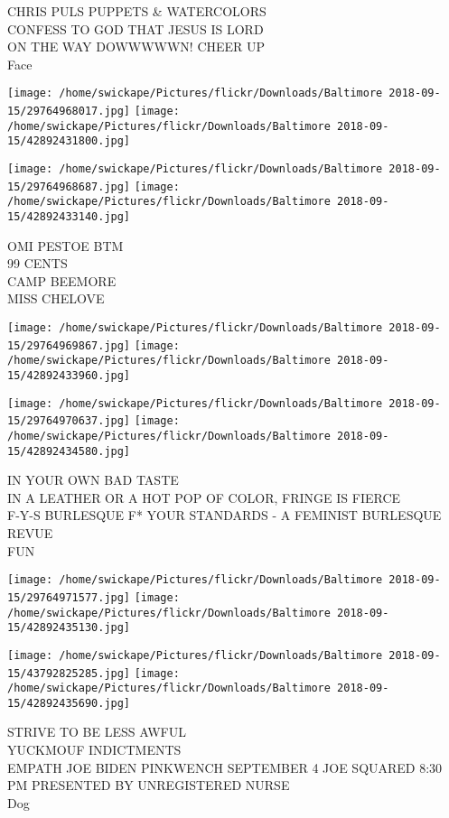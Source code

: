 \documentclass[10pt,letterpaper]{article}
\begin{document}
CHRIS PULS PUPPETS \& WATERCOLORS\\
CONFESS TO GOD THAT JESUS IS LORD\\
ON THE WAY DOWWWWWN!  CHEER UP\\
Face
\pagebreak

\texttt{[image: /home/swickape/Pictures/flickr/Downloads/Baltimore 2018-09-15/29764968017.jpg]}
\texttt{[image: /home/swickape/Pictures/flickr/Downloads/Baltimore 2018-09-15/42892431800.jpg]}

\texttt{[image: /home/swickape/Pictures/flickr/Downloads/Baltimore 2018-09-15/29764968687.jpg]}
\texttt{[image: /home/swickape/Pictures/flickr/Downloads/Baltimore 2018-09-15/42892433140.jpg]}

OMI PESTOE BTM\\
99 CENTS\\
CAMP BEEMORE\\
MISS CHELOVE
\pagebreak

\texttt{[image: /home/swickape/Pictures/flickr/Downloads/Baltimore 2018-09-15/29764969867.jpg]}
\texttt{[image: /home/swickape/Pictures/flickr/Downloads/Baltimore 2018-09-15/42892433960.jpg]}

\texttt{[image: /home/swickape/Pictures/flickr/Downloads/Baltimore 2018-09-15/29764970637.jpg]}
\texttt{[image: /home/swickape/Pictures/flickr/Downloads/Baltimore 2018-09-15/42892434580.jpg]}

IN YOUR OWN BAD TASTE\\
IN A LEATHER OR A HOT POP OF COLOR, FRINGE IS FIERCE\\
F{-}Y{-}S BURLESQUE F* YOUR STANDARDS {-} A FEMINIST BURLESQUE REVUE\\
FUN
\pagebreak

\texttt{[image: /home/swickape/Pictures/flickr/Downloads/Baltimore 2018-09-15/29764971577.jpg]}
\texttt{[image: /home/swickape/Pictures/flickr/Downloads/Baltimore 2018-09-15/42892435130.jpg]}

\texttt{[image: /home/swickape/Pictures/flickr/Downloads/Baltimore 2018-09-15/43792825285.jpg]}
\texttt{[image: /home/swickape/Pictures/flickr/Downloads/Baltimore 2018-09-15/42892435690.jpg]}

STRIVE TO BE LESS AWFUL\\
YUCKMOUF INDICTMENTS\\
EMPATH JOE BIDEN PINKWENCH SEPTEMBER 4 JOE SQUARED 8:30 PM PRESENTED BY UNREGISTERED NURSE\\
Dog
\pagebreak
\end{document}
